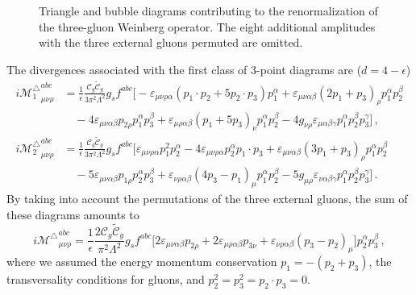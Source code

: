 \begin{figure}[h!tb]
\caption{Triangle and bubble diagrams contributing to the renormalization of the three-gluon Weinberg operator. 
The eight additional amplitudes with the three external gluons permuted are omitted.}
\label{fig:Wienbergdiagrams}
\end{figure}

The divergences associated with the first class of 3-point diagrams 
are 
($d=4-\epsilon$)
\begin{align}
    i {\mathcal M_{1}^\triangle}_{\mu\nu\rho}^{abc} &= \frac{1}{\epsilon}\frac{\mathcal C_g \tilde{\mathcal C}_g}{3\pi^2 \Lambda^2}g_sf^{abc}\big[-\varepsilon_{\mu\nu\rho\alpha}(p_1\cdot p_2+5p_2\cdot p_3)p_1^\alpha 
    +\varepsilon_{\mu\nu\alpha\beta}(2p_1+p_3)_\rho p_1^\alpha p_2^\beta \nonumber \\
    &\quad
    -4 \varepsilon_{\mu\nu\alpha\beta}p_{2\rho} p_1^\alpha p_3^\beta 
    + \varepsilon_{\mu\rho\alpha\beta}(p_1+5p_3)_\nu p_1^\alpha p_2^\beta - 4 g_{\nu\rho}\varepsilon_{\mu\alpha\beta\gamma}p_1^\alpha p_2^\beta p_3^\gamma
    \big]\,,\\
    i {\mathcal M_{2}^\triangle}_{\mu\nu\rho}^{abc} &= \frac{1}{\epsilon}\frac{\mathcal C_g \tilde{\mathcal C}_g}{3\pi^2 \Lambda^2}g_sf^{abc}\big[
    \varepsilon_{\mu\nu\rho\alpha}p_1^2 p_2^\alpha
    -4 \varepsilon_{\mu\nu\rho\alpha}p_2^\alpha  p_1\cdot p_3 
    + \varepsilon_{\mu\nu\alpha\beta}(3p_1+p_3)_\rho p_1^\alpha p_2^\beta \nonumber \\
    &\quad
    - 5 \varepsilon_{\mu\nu\alpha\beta}p_{1\rho} p_2^\alpha p_3^\beta 
    +\varepsilon_{\nu\rho\alpha\beta}(4p_3-p_1)_\mu p_1^\alpha p_2^\beta
    -5 g_{\mu\rho} \varepsilon_{\nu\alpha\beta\gamma} p_1^\alpha p_2^\beta p_3^\gamma
    \big]\,.
\end{align}
%
%
By taking into account the permutations of the three external gluons, the sum of these diagrams amounts to 
%
\begin{equation}
i {\mathcal{M}^{\triangle}}_{\mu\nu\rho}^{abc} = \frac{1}{\epsilon}\frac{2\mathcal C_g \tilde{\mathcal C}_g}{\pi^2 \Lambda^2}g_s f^{abc} \big[
2\varepsilon_{\mu\nu\alpha\beta}p_{2\rho} 
+ 2\varepsilon_{\mu\rho\alpha\beta}p_{3\nu}
+\varepsilon_{\nu\rho\alpha\beta}(p_3-p_2)_\mu
\big] p_2^\alpha p_3^\beta\,,
\end{equation}
%
where we assumed the energy momentum conservation $p_1 = - (p_2+p_3)$, the transversality conditions for gluons, and
$p_2^2=p_3^2=p_2\cdot p_3 = 0$. 

